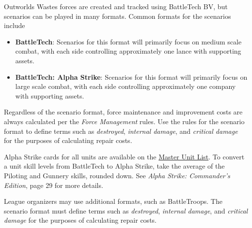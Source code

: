 Outworlds Wastes forces are created and tracked using BattleTech BV, but scenarios can be played in many formats.
Common formats for the scenarios include

\begin{itemize}

\item {\bfseries BattleTech}: Scenarios for this format will primarily focus on medium scale combat, with each side controlling approximately one lance with supporting assets.

\item {\bfseries BattleTech: Alpha Strike}: Scenarios for this format will primarily focus on large scale combat, with each side controlling approximately one company with supporting assets.

\end{itemize}

Regardless of the scenario format, force maintenance and improvement costs are always calculated per the \emph{Force Management} rules.
Use the rules for the scenario format to define terms such as \emph{destroyed}, \emph{internal damage}, and \emph{critical damage} for the purposes of calculating repair costs.

Alpha Strike cards for all units are available on the \href{http://www.masterunitlist.info}{Master Unit List}.
To convert a unit skill levels from BattleTech to Alpha Strike, take the average of the Piloting and Gunnery skills, rounded down.
See \emph{Alpha Strike: Commander's Edition}, page 29 for more details.

League organizers may use additional formats, such as BattleTroops.
The scenario format must define terms such as \emph{destroyed}, \emph{internal damage}, and \emph{critical damage} for the purposes of calculating repair costs.
